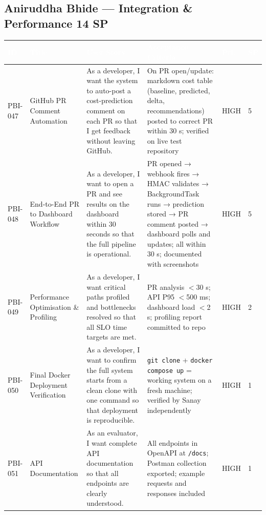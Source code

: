 \documentclass[10pt,a4paper]{article}
\begin{document}
\subsection*{Aniruddha Bhide — Integration \& Performance \hfill 14 SP}

\renewcommand{\arraystretch}{1.45}
\begin{tabularx}{\textwidth}{|L{1.5cm}|L{3cm}|X|L{3cm}|L{1cm}|L{0.6cm}|}
\hline
{}
\textcolor{white}{\textbf{ID}} &
\textcolor{white}{\textbf{Title}} &
\textcolor{white}{\textbf{User Story}} &
\textcolor{white}{\textbf{Acceptance Criteria}} &
\textcolor{white}{\textbf{Pri.}} &
\textcolor{white}{\textbf{SP}} \\ \hline

PBI-047 &
GitHub PR Comment Automation &
As a developer, I want the system to auto-post a cost-prediction comment on each PR so that I get feedback without leaving GitHub. &
On PR open/update: markdown cost table (baseline, predicted, delta, recommendations) posted to correct PR within 30 s; verified on live test repository &
HIGH & 5 \\ \hline

PBI-048 &
End-to-End PR to Dashboard Workflow &
As a developer, I want to open a PR and see results on the dashboard within 30 seconds so that the full pipeline is operational. &
PR opened → webhook fires → HMAC validates → BackgroundTask runs → prediction stored → PR comment posted → dashboard polls and updates; all within 30 s; documented with screenshots &
HIGH & 5 \\ \hline

PBI-049 &
Performance Optimisation \& Profiling &
As a developer, I want critical paths profiled and bottlenecks resolved so that all SLO time targets are met. &
PR analysis $<$30 s; API P95 $<$500 ms; dashboard load $<$2 s; profiling report committed to repo &
HIGH & 2 \\ \hline

PBI-050 &
Final Docker Deployment Verification &
As a developer, I want to confirm the full system starts from a clean clone with one command so that deployment is reproducible. &
\texttt{git clone} + \texttt{docker compose up} = working system on a fresh machine; verified by Sanay independently &
HIGH & 1 \\ \hline

PBI-051 &
API Documentation &
As an evaluator, I want complete API documentation so that all endpoints are clearly understood. &
All endpoints in OpenAPI at \texttt{/docs}; Postman collection exported; example requests and responses included &
HIGH & 1 \\ \hline

\end{tabularx}
\end{document}
